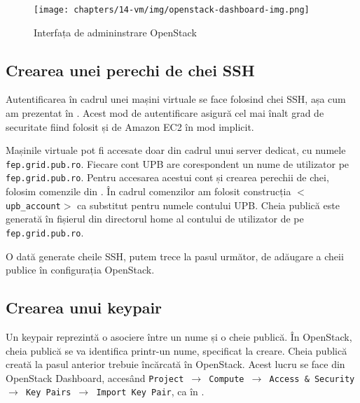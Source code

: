 \begin{figure}[!htbp]
  \centering
  \texttt{[image: chapters/14-vm/img/openstack-dashboard-img.png]}
  \caption{Interfața de admininstrare OpenStack}
  \label{fig:vm:openstack-dashboard}
\end{figure}

\subsection{Crearea unei perechi de chei SSH}
\label{sec:vm:upb-openstack:keys}

Autentificarea în cadrul unei mașini virtuale se face folosind chei SSH, așa cum am prezentat în .
Acest mod de autentificare asigură cel mai înalt grad de securitate fiind folosit și de Amazon EC2 în mod implicit.

Mașinile virtuale pot fi accesate doar din cadrul unui server dedicat, cu numele \texttt{fep.grid.pub.ro}.
 Fiecare cont UPB are corespondent un nume de utilizator pe \texttt{fep.grid.pub.ro}.
 Pentru accesarea acestui cont și crearea perechii de chei, folosim comenzile din .
 În cadrul comenzilor am folosit construcția \texttt{$<$upb\_account$>$} ca substitut pentru numele contului UPB.
 Cheia publică este generată în fișierul  din directorul home al contului de utilizator de pe \texttt{fep.grid.pub.ro}.


O dată generate cheile SSH, putem trece la pasul următor, de adăugare a cheii publice în configurația OpenStack.

\subsection{Crearea unui keypair}
\label{sec:vm:upb-openstack:keypares}

Un keypair reprezintă o asociere între un nume și o cheie publică.
În OpenStack, cheia publică se va identifica printr-un nume, specificat la creare.
Cheia publică creată la pasul anterior trebuie încărcată în OpenStack.
Acest lucru se face din OpenStack Dashboard, accesând \texttt{Project $\rightarrow$ Compute $\rightarrow$ Access \& Security $\rightarrow$ Key Pairs $\rightarrow$ Import Key Pair}, ca în .

